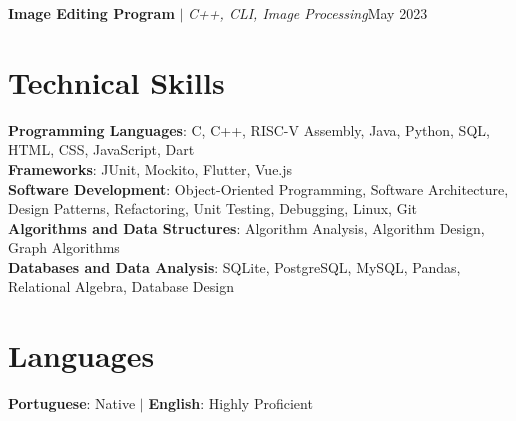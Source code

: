 \begin{resumeSubHeadingList}
  \resumeProjectHeading%
  {{\textbf{Image Editing Program}
    \href{https://github.com/peucastro/prog_project}{\faLink}} $|$
  \emph{C++, CLI, Image Processing}}{May 2023}
  \begin{resumeItemList}
  \end{resumeItemList}

\end{resumeSubHeadingList}

\section{Technical Skills}
\begin{itemize}[leftmargin=0.15in, label={}]
    \small{
    \item{
        \textbf{Programming Languages}{: C, C++, RISC-V Assembly,
        Java, Python, SQL, HTML, CSS, JavaScript, Dart} \\
        \textbf{Frameworks}{: JUnit, Mockito, Flutter, Vue.js} \\
        \textbf{Software Development}{: Object-Oriented Programming,
          Software Architecture, Design Patterns, Refactoring, Unit
        Testing, Debugging, Linux, Git} \\
        \textbf{Algorithms and Data Structures}{: Algorithm Analysis,
        Algorithm Design, Graph Algorithms} \\
        \textbf{Databases and Data Analysis}{: SQLite, PostgreSQL,
        MySQL, Pandas, Relational Algebra, Database Design}
    }}
\end{itemize}

\section{Languages}
\begin{itemize}[leftmargin=0.15in, label={}]
    \small{
    \item{
        \textbf{Portuguese}{: Native} $|$
        \textbf{English}{: Highly Proficient}
    }}
\end{itemize}


